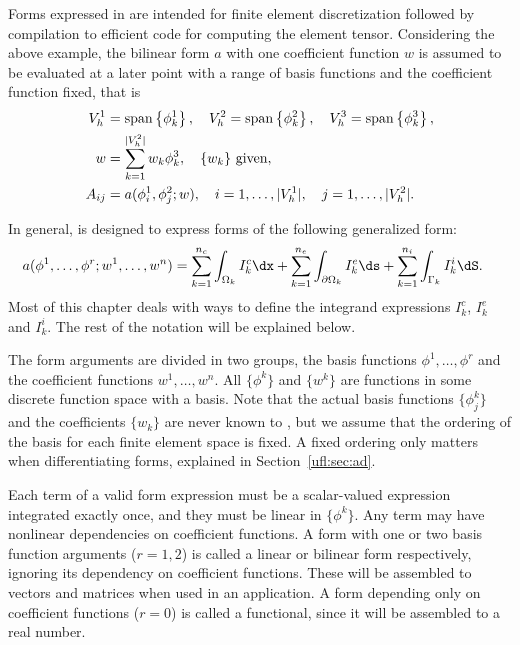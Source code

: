 Forms expressed in \ufl{} are intended for finite element discretization
followed by compilation to efficient code for computing the element tensor.
Considering the above example, the bilinear form $a$ with one coefficient
function $w$ is assumed to be evaluated at a later point with a
range of basis functions and the coefficient function fixed, that is
\begin{align}
V_h^1 &= \operatorname{span}\left\{ \phi_k^1 \right\}, \quad V_h^2 = \operatorname{span}\left\{ \phi_k^2 \right\}, \quad V_h^3 = \operatorname{span}\left\{ \phi_k^3 \right\}, \\
w &= \sum_{k=1}^{|V^2_h|} w_k \phi_k^3, \quad \{ w_k \} \mbox{ given}, \\
A_{ij} &= a(\phi_i^1, \phi_j^2; w),
    \quad i = 1,\ldots,|V^1_h|, \quad j = 1,\ldots,|V^2_h| . \label{ufl:eq:Aij}
\end{align}

In general, \ufl{} is designed to express forms of the following generalized form:
\begin{align} \label{ufl:eq:form_integrals}
    a(&\phi^1, \ldots, \phi^r; w^1, \ldots,  w^n) =
           \sum_{k=1}^{n_c} \int_{\Omega_k}          I^c_k \dx
         + \sum_{k=1}^{n_e} \int_{\partial\Omega_k}  I^e_k \ds
         + \sum_{k=1}^{n_i} \int_{\Gamma_k}          I^i_k \dS.
\end{align}
Most of this chapter deals with ways to define the integrand
expressions $I^c_k$, $I^e_k$ and $I^i_k$.  The rest of the notation
will be explained below.

The form arguments are divided in two groups, the basis functions
$\phi^1,\ldots,\phi^r$ and the coefficient functions $w^1,\ldots,w^n$.
All $\{ \phi^k \}$ and $\{ w^k \}$ are functions in some discrete
function space with a basis.  Note that the actual basis functions $\{
\phi_j^k \}$ and the coefficients $\{ w_k \}$ are never known to
\ufl{}, but we assume that the ordering of the basis for each finite
element space is fixed. A fixed ordering only matters when
differentiating forms, explained in Section~\ref{ufl:sec:ad}.

Each term of a valid form expression must be a scalar-valued
expression integrated exactly once, and they must be linear in $\{
\phi^k \}$.  Any term may have nonlinear dependencies on coefficient
functions.  A form with one or two basis function arguments ($r=1,2$)
is called a linear or bilinear form respectively, ignoring its
dependency on coefficient functions. These will be assembled to
vectors and matrices when used in an application.  A form depending
only on coefficient functions ($r=0$) is called a functional, since it
will be assembled to a real number.

